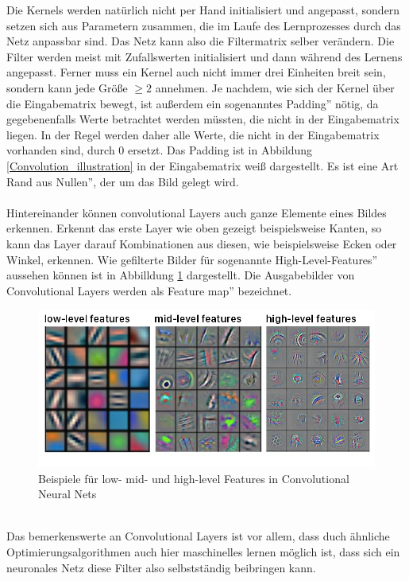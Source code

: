 \documentclass[11pt]{article}
\begin{document}
Die Kernels werden natürlich nicht per Hand initialisiert und angepasst, sondern setzen sich aus Parametern zusammen, die im Laufe des Lernprozesses durch das Netz anpassbar sind. Das Netz kann also die Filtermatrix selber verändern. Die Filter werden meist mit Zufallswerten initialisiert und dann während des Lernens  angepasst. Ferner muss ein Kernel auch nicht immer drei Einheiten breit sein, sondern kann jede Größe $\ge2$ annehmen. Je nachdem, wie sich der Kernel über die Eingabematrix bewegt, ist außerdem ein sogenanntes \glqq Padding'' nötig, da gegebenenfalls Werte betrachtet werden müssten, die nicht in der Eingabematrix liegen. In der Regel werden daher alle Werte, die nicht in der Eingabematrix vorhanden sind, durch 0 ersetzt. Das Padding ist in Abbildung \ref{Convolution_illustration} in der Eingabematrix weiß dargestellt. Es ist eine Art \glqq Rand aus Nullen'', der um das Bild gelegt wird.
\\ 
\\
Hintereinander können convolutional Layers auch ganze Elemente eines Bildes erkennen. Erkennt das erste Layer wie oben gezeigt beispielsweise Kanten, so kann das Layer darauf Kombinationen aus diesen, wie beispielsweise Ecken oder Winkel, erkennen. Wie gefilterte Bilder für sogenannte \glqq High-Level-Features'' aussehen können ist in Abbilldung \ref{HL_features_conv} dargestellt. Die Ausgabebilder von Convolutional Layers werden als \glqq Feature map'' bezeichnet.
\begin{figure}[h]
	\includegraphics[width=\linewidth]{../graphics/features.png}
	\caption[Beispiele für low- mid- und high-level Features in Convolutional Neural Nets\newline
	Quelle: https://tvirdi.github.io/2017-10-29/cnn/]{Beispiele für low- mid- und high-level Features in Convolutional Neural Nets}
	\label{HL_features_conv}
\end{figure}
\\
Das bemerkenswerte an Convolutional Layers ist vor allem, dass duch ähnliche Optimierungsalgorithmen auch hier maschinelles lernen möglich ist, dass sich ein neuronales Netz diese Filter also selbstständig beibringen kann.
\end{document}
